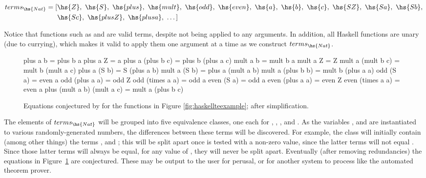 \begin{align*}
  terms_{\hs{Nat}} = [& \hs{Z},\ \hs{S},\ \hs{plus},\ \hs{mult},\ \hs{odd},
                     \ \hs{even},\ \hs{a},\ \hs{b},\ \hs{c},\ \hs{S Z},
                     \ \hs{S a},\ \hs{S b}, \\
                     & \hs{S c},\ \hs{plus Z},\ \hs{plus a},\ \dots ]
\end{align*}

Notice that functions such as  and  are valid terms, despite
not being applied to any arguments. In addition, all Haskell functions are unary
(due to currying), which makes it valid to apply them one argument at a time as
we construct $terms_{\hs{Nat}}$.

\begin{figure}
  \begin{haskell}
                      plus a b = plus b a
                      plus a Z = a
             plus a (plus b c) = plus b (plus a c)
                      mult a b = mult b a
                      mult a Z = Z
             mult a (mult b c) = mult b (mult a c)
                  plus a (S b) = S (plus a b)
                  mult a (S b) = plus a (mult a b)
             mult a (plus b b) = mult b (plus a a)
                     odd (S a) = even a
                odd (plus a a) = odd Z
               odd (times a a) = odd a
                    even (S a) = odd a
               even (plus a a) = even Z
              even (times a a) = even a
    plus (mult a b) (mult a c) = mult a (plus b c)
  \end{haskell}
  \caption{Equations conjectured by \quickspec{} for the functions in Figure
    \ref{fig:haskellteexample}; after simplification.}
  \label{fig:qspecresult}
\end{figure}

The elements of $terms_{\hs{Nat}}$ will be grouped into five equivalence classes,
one each for , , , 
and . As the variables ,  and  are instantiated to
various randomly-generated numbers, the differences between these terms will
be discovered. For example, the  class will initially contain (among
other things) the terms ,  and ; this will be split
apart once  is tested with a non-zero value, since the latter terms will
not equal . Since those latter terms will always be equal, for any value
of , they will never be split apart. Eventually (after removing
redundancies) the equations in Figure~\ref{fig:qspecresult} are conjectured.
These may be output to the user for perusal, or for another system to process
like the \hipspec{} automated theorem prover.

